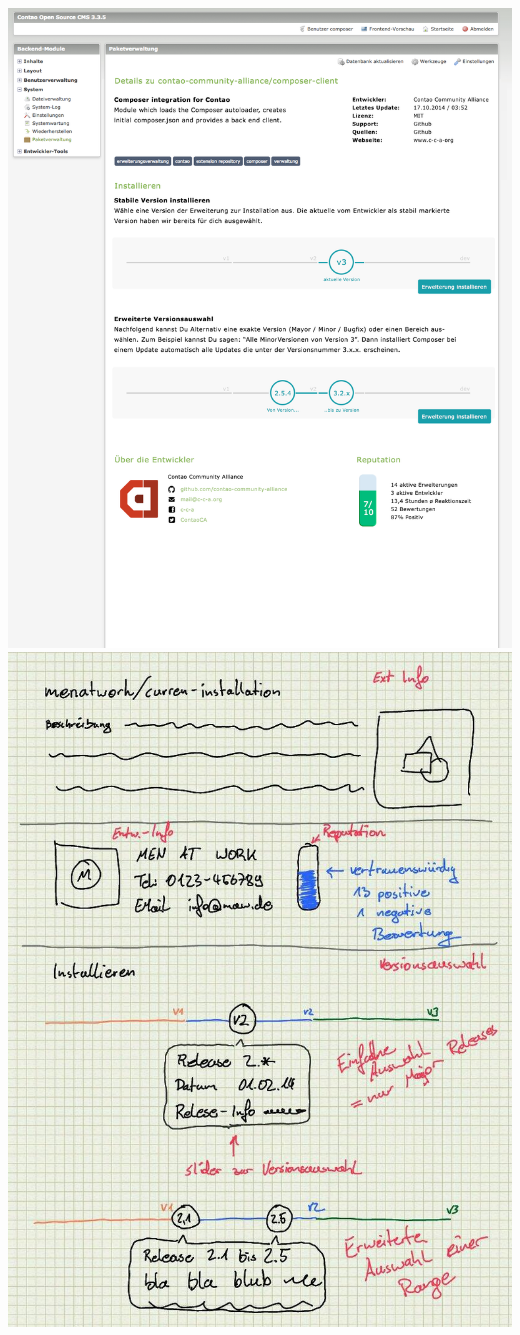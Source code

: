 \documentclass[
paper=a4,
draft=false,%
fontsize=10pt%
]{scrartcl}
\begin{document}
\includegraphics[width=\textwidth]{bilder/Composer-detail.png}
\includegraphics[width=\textwidth]{bilder/tristan-scribble.jpg}
\end{document}

